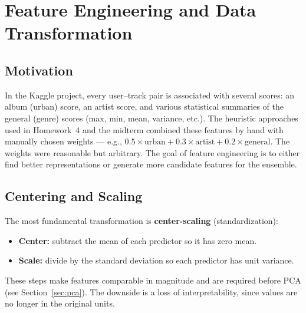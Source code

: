 \documentclass[11pt]{article}
\begin{document}
\newpage
\section{Feature Engineering and Data Transformation}

\subsection{Motivation}
In the Kaggle project, every user--track pair is associated with several scores: an album (urban) score, an artist score, and various statistical summaries of the general (genre) scores (max, min, mean, variance, etc.). The heuristic approaches used in Homework~4 and the midterm combined these features by hand with manually chosen weights --- e.g., $0.5 \times \text{urban} + 0.3 \times \text{artist} + 0.2 \times \text{general}$. The weights were reasonable but arbitrary. The goal of feature engineering is to either find better representations or generate more candidate features for the ensemble.

\subsection{Centering and Scaling}
The most fundamental transformation is \textbf{center-scaling} (standardization):
\begin{itemize}
    \item \textbf{Center:} subtract the mean of each predictor so it has zero mean.
    \item \textbf{Scale:} divide by the standard deviation so each predictor has unit variance.
\end{itemize}
These steps make features comparable in magnitude and are required before PCA (see Section~\ref{sec:pca}). The downside is a loss of interpretability, since values are no longer in the original units.
\end{document}
